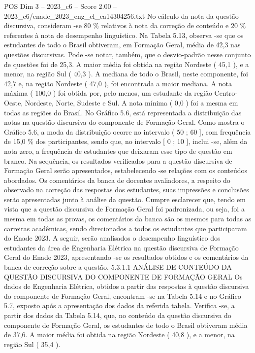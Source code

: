 \begin{textsample}{POS Dim 3 – 2023\_c6 – Score 2.00 – 2023\_c6/enade\_2023\_eng\_el\_ca14304256.txt}
No cálculo da nota da questão discursiva, consideram -se 80 \% relativos à nota da correção de conteúdo e 20 \% referentes à nota de desempenho linguístico.
Na Tabela 5.13, observa -se que os estudantes de todo o Brasil obtiveram, em Formação Geral, média de 42,3 nas questões discursivas.
Pode -se notar, também, que o desvio-padrão nesse conjunto de questões foi de 25,3.
A maior média foi obtida na região Nordeste ( 45,1 ), e a menor, na região Sul ( 40,3 ).
A mediana de todo o Brasil, neste componente, foi 42,7 e, na região Nordeste ( 47,0 ), foi encontrada a maior mediana.
A nota máxima ( 100,0 ) foi obtida por, pelo menos, um estudante da região Centro-Oeste, Nordeste, Norte, Sudeste e Sul.
A nota mínima ( 0,0 ) foi a mesma em todas as regiões do Brasil.
No Gráfico 5.6, está representada a distribuição das notas na questão discursiva do componente de Formação Geral.
Como mostra o Gráfico 5.6, a moda da distribuição ocorre no intervalo ( 50 ; 60 ], com frequência de 15,0 \% dos participantes, sendo que, no intervalo [ 0 ; 10 ], inclui -se, além da nota zero, a frequência de estudantes que deixaram esse tipo de questão em branco.
Na sequência, os resultados verificados para a questão discursiva de Formação Geral serão apresentados, estabelecendo -se relações com os conteúdos abordados.
Os comentários da banca de docentes avaliadores, a respeito do observado na correção das respostas dos estudantes, suas impressões e conclusões serão apresentadas junto à análise da questão.
Cumpre esclarecer que, tendo em vista que a questão discursiva de Formação Geral foi padronizada, ou seja, foi a mesma em todas as provas, os comentários da banca são os mesmos para todas as carreiras acadêmicas, sendo direcionados a todos os estudantes que participaram do Enade 2023.
A seguir, serão analisados o desempenho linguístico dos estudantes da área de Engenharia Elétrica na questão discursiva de Formação Geral do Enade 2023, apresentando -se os resultados obtidos e os comentários da banca de correção sobre a questão. 5.3.1.1 ANÁLISE DE CONTEÚDO DA QUESTÃO DISCURSIVA DO COMPONENTE DE FORMAÇÃO GERAL Os dados de Engenharia Elétrica, obtidos a partir das respostas à questão discursiva do componente de Formação Geral, encontram -se na Tabela 5.14 e no Gráfico 5.7, exposto após a apresentação dos dados da referida tabela.
Verifica -se, a partir dos dados da Tabela 5.14, que, no conteúdo da questão discursiva do componente de Formação Geral, os estudantes de todo o Brasil obtiveram média de 37,6.
A maior média foi obtida na região Nordeste ( 40,8 ), e a menor, na região Sul ( 35,4 ).

\end{textsample}
